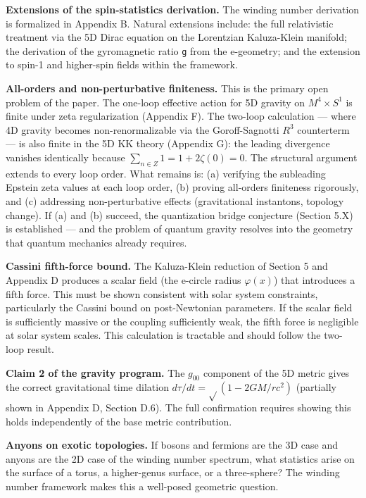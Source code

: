 \documentclass[aps,prd,preprint,superscriptaddress,longbibliography,floatfix]{revtex4-2}
\theoremstyle{remark}
\begin{document}
\textbf{Extensions of the spin-statistics derivation.} The winding number derivation is formalized in Appendix B. Natural extensions include: the full relativistic treatment via the 5D Dirac equation on the Lorentzian Kaluza-Klein manifold; the derivation of the gyromagnetic ratio \texttt{g} from the e-geometry; and the extension to spin-1 and higher-spin fields within the framework.

\textbf{All-orders and non-perturbative finiteness.} This is the primary open problem of the paper. The one-loop effective action for 5D gravity on $M^{4} \times S^{1}$ is finite under zeta regularization (Appendix F). The two-loop calculation --- where 4D gravity becomes non-renormalizable via the Goroff-Sagnotti $R^{3}$ counterterm --- is also finite in the 5D KK theory (Appendix G): the leading divergence vanishes identically because $\sum_{n\in Z} 1 = 1 + 2\zeta(0) = 0$. The structural argument extends to every loop order. What remains is: (a) verifying the subleading Epstein zeta values at each loop order, (b) proving all-orders finiteness rigorously, and (c) addressing non-perturbative effects (gravitational instantons, topology change). If (a) and (b) succeed, the quantization bridge conjecture (Section 5.X) is established --- and the problem of quantum gravity resolves into the geometry that quantum mechanics already requires.

\textbf{Cassini fifth-force bound.} The Kaluza-Klein reduction of Section 5 and Appendix D produces a scalar field (the e-circle radius $\varphi(x)$) that introduces a fifth force. This must be shown consistent with solar system constraints, particularly the Cassini bound on post-Newtonian parameters. If the scalar field is sufficiently massive or the coupling sufficiently weak, the fifth force is negligible at solar system scales. This calculation is tractable and should follow the two-loop result.

\textbf{Claim 2 of the gravity program.} The $g_{00}$ component of the 5D metric gives the correct gravitational time dilation $d\tau/dt = \sqrt{}(1 - 2GM/rc^{2})$ (partially shown in Appendix D, Section D.6). The full confirmation requires showing this holds independently of the base metric contribution.

\textbf{Anyons on exotic topologies.} If bosons and fermions are the 3D case and anyons are the 2D case of the winding number spectrum, what statistics arise on the surface of a torus, a higher-genus surface, or a three-sphere? The winding number framework makes this a well-posed geometric question.
\end{document}

